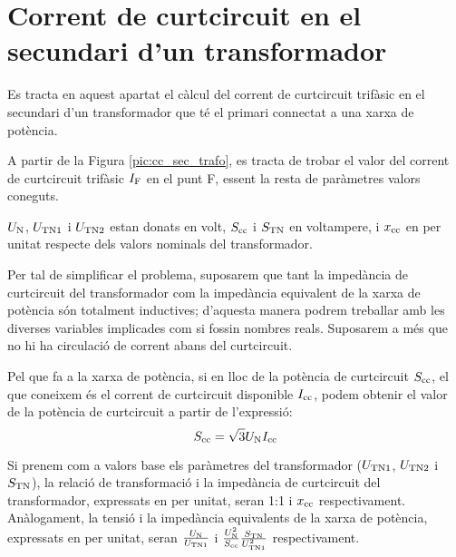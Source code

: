 \section{Corrent de curtcircuit en el  secundari d'un transformador}
\label{sec:cc-sec-trafo}

 Es tracta en aquest apartat el càlcul del corrent de curtcircuit trifàsic en el secundari d'un transformador que té el
primari connectat  a una xarxa de potència.

A partir de la Figura \vref{pic:cc_sec_trafo}, es tracta de trobar
el valor del corrent de curtcircuit trifàsic $I_\mathrm{F}$ en el punt
F, essent la resta de paràmetres valors coneguts.

\begin{center}
    
     \label{pic:cc_sec_trafo}
\end{center}

$U_\mathrm{N}$, $U_\mathrm{TN1}$ i $U_\mathrm{TN2}$ estan donats en volt,
$S_\mathrm{cc}$ i $S_\mathrm{TN}$ en voltampere, i $x_\mathrm{cc}$ en per unitat
respecte dels valors nominals del transformador.


Per tal de simplificar el problema, suposarem que tant la impedància
de curtcircuit del transformador com la impedància equivalent de
la xarxa de potència són totalment inductives; d'aquesta manera
podrem treballar amb les diverses variables implicades com si
fossin nombres reals. Suposarem a més que no hi ha circulació de
corrent abans del curtcircuit.

Pel que fa a la xarxa de potència, si en lloc de la potència de curtcircuit $S_\mathrm{cc}$, el que coneixem és el corrent de curtcircuit
disponible $I_\mathrm{cc}$, podem obtenir el valor de la potència de
curtcircuit a partir de l'expressió:
\begin{equation}
    S_\mathrm{cc} = \sqrt{3} U_\mathrm{N} I_\mathrm{cc}
\end{equation}

 Si prenem com a valors base els
paràmetres del transformador ($U_\mathrm{TN1}$, $U_\mathrm{TN2}$ i
$S_\mathrm{TN}$), la relació de transformació i la impedància de curtcircuit del transformador, expressats en per unitat, seran 1:1 i
$x_\mathrm{cc}$ respectivament. Anàlogament, la tensió i la impedància
equivalents de la xarxa de potència, expressats en per unitat, seran
$\frac{U_\mathrm{N}}{U_\mathrm{TN1}}$ i $\frac{U_\mathrm{N}^2}{S_\mathrm{cc}}
\frac{S_\mathrm{TN}}{U_\mathrm{TN1}^2}$ respectivament.

